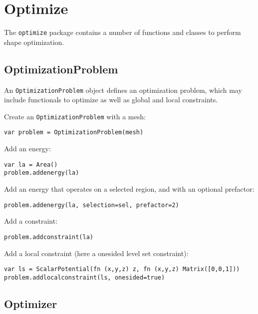 \hypertarget{optimize}{%
\section{Optimize}\label{optimize}}

The \texttt{optimize} package contains a number of functions and classes
to perform shape optimization.

\hypertarget{optimizationproblem}{%
\subsection{OptimizationProblem}\label{optimizationproblem}}

An \texttt{OptimizationProblem} object defines an optimization problem,
which may include functionals to optimize as well as global and local
constraints.

Create an \texttt{OptimizationProblem} with a mesh:

\begin{lstlisting}
var problem = OptimizationProblem(mesh)
\end{lstlisting}

Add an energy:

\begin{lstlisting}
var la = Area()
problem.addenergy(la)
\end{lstlisting}

Add an energy that operates on a selected region, and with an optional
prefactor:

\begin{lstlisting}
problem.addenergy(la, selection=sel, prefactor=2)
\end{lstlisting}

Add a constraint:

\begin{lstlisting}
problem.addconstraint(la)
\end{lstlisting}

Add a local constraint (here a onesided level set constraint):

\begin{lstlisting}
var ls = ScalarPotential(fn (x,y,z) z, fn (x,y,z) Matrix([0,0,1]))
problem.addlocalconstraint(ls, onesided=true)
\end{lstlisting}

\hypertarget{optimizer}{%
\subsection{Optimizer}\label{optimizer}}

